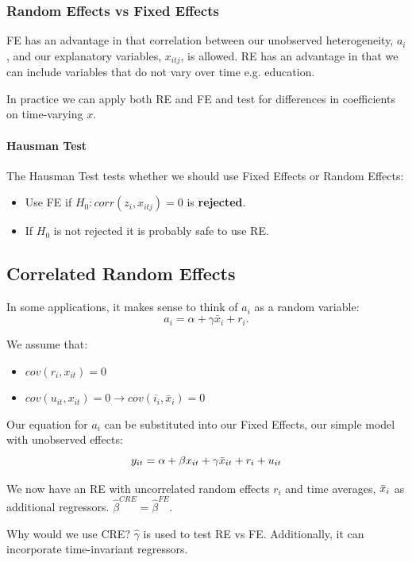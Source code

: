 \documentclass[11pt]{article}
\begin{document}
\subsubsection{Random Effects vs Fixed Effects}

FE has an advantage in that correlation between our unobserved heterogeneity, $a_i$, and our explanatory variables, $x_{itj}$, is allowed. RE has an advantage in that we can include variables that do not vary over time e.g. education.

In practice we can apply both RE and FE and test for differences in coefficients on time-varying $x$.

\paragraph{Hausman Test}

The Hausman Test tests whether we should use Fixed Effects or Random Effects:
\begin{itemize}
    \item Use FE if $H_0: corr(z_i,x_{itj}) = 0$ is \textbf{rejected}.
    \item If $H_0$ is not rejected it is probably safe to use RE.
\end{itemize}


\subsection{Correlated Random Effects}
In some applications, it makes sense to think of $a_i$ as a random variable:
\[a_i = \alpha + \gamma \bar{x}_i + r_i.\]

We assume that:
\begin{itemize}
    \item $cov(r_i,x_{it})=0$
    \item $cov(u_{it}, x_{it}) = 0 \rightarrow cov(i_i, \bar{x}_i) = 0$
\end{itemize}

Our equation for $a_i$ can be substituted into our Fixed Effects, our simple model with unobserved effects:
\[y_{it} = \alpha + \beta x_{it} + \gamma \Bar{x}_{it} + r_i + u_{it}\]

 We now have an RE with uncorrelated random effects $r_i$ and time averages, $\Bar{x}_i$ as additional regressors. $\hat{\beta}^{CRE} = \hat{\beta}^{FE}$.

 Why would we use CRE? $\hat{\gamma}$ is used to test RE vs FE. Additionally, it can incorporate time-invariant regressors.
\end{document}
